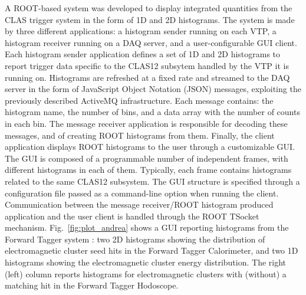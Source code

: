 
A ROOT-based system was developed to display integrated quantities from the CLAS trigger system in the form of 1D and 2D histograms. The system is made by three different applications: a histogram sender running on each VTP, a histogram receiver running on a DAQ server, and a user-configurable GUI client.
Each histogram sender application defines a set of 1D and 2D histograms to report trigger data specific to the CLAS12 subsytem handled by the VTP it is running on. Histograms are refreshed at a fixed rate and streamed to the DAQ server in the form of JavaScript Object Notation (JSON) messages, exploiting the previously described ActiveMQ infrastructure. Each message contains: the histogram name, the number of bins, and a data array with the number of counts in each bin.
The message receiver application is responsible for decoding these messages, and of creating ROOT histograms from them. Finally, the client application displays ROOT histograms to the user through a customizable GUI. The GUI is composed of a programmable number of independent frames, with different histograms in each of them. Typically, each frame contains histograms related to the same CLAS12 subsystem. The GUI structure is specified through a configuration file passed as a command-line option when running the client. Communication between the message receiver/ROOT histogram produced application and the user client is handled through the ROOT TSocket mechanism.
Fig.~\ref{fig:plot_andrea} shows a GUI reporting histograms from the Forward Tagger system \cite{ft-ref}: two 2D histograms showing the distribution of electromagnetic cluster seed hits in the Forward Tagger Calorimeter, and two 1D histograms showing the electromagnetic cluster energy distribution. The right (left) column reports histograms for electromagnetic clusters  with (without) a matching hit in the Forward Tagger Hodoscope.

